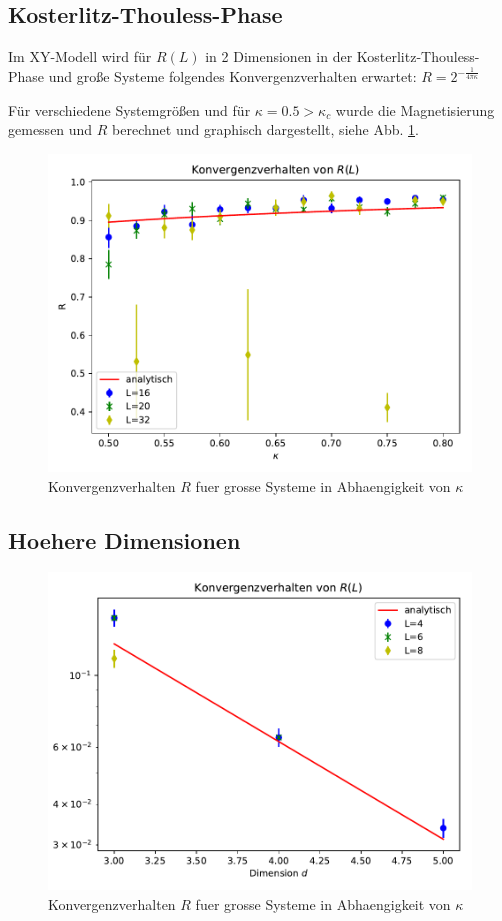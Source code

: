 \documentclass[10pt,a4paper]{article}
\begin{document}
\subsection{Kosterlitz-Thouless-Phase}
Im XY-Modell wird für $R(L)$ in 2 Dimensionen in der Kosterlitz-Thouless-Phase
und große Systeme folgendes Konvergenzverhalten erwartet:
$R= 2^{-\frac{1}{4\pi \kappa}}$

Für verschiedene Systemgrößen und für $\kappa=0.5>\kappa_c$ wurde die Magnetisierung
gemessen und $R$ berechnet und graphisch dargestellt, siehe Abb. \ref{fig:c2d}.

\begin{figure}
  \centering
  \includegraphics[width=\textwidth]{../figures/conv_2d.pdf}
  \caption{Konvergenzverhalten $R$ fuer grosse Systeme in Abhaengigkeit von $\kappa$}\label{fig:c2d}
\end{figure}

\subsection{Hoehere Dimensionen}
\begin{figure}
  \centering
  \includegraphics[width=\textwidth]{../figures/conv_nd.pdf}
  \caption{Konvergenzverhalten $R$ fuer grosse Systeme in Abhaengigkeit von $\kappa$}\label{fig:cnd}
\end{figure}
\end{document}
